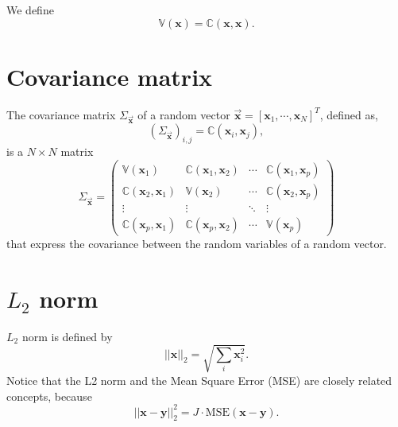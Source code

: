 We define
\begin{equation}
  \mathbb{V}(\mathbf{x}) = \mathbb{C}(\mathbf{x}, \mathbf{x}).
\end{equation}


\section{Covariance matrix}
\label{sec:covariance_matrix}

The covariance matrix $\Sigma_{\overrightarrow{\mathbf{x}}}$ of a random vector $\overrightarrow{\mathbf{x}}=[\mathbf{x}_1,\cdots,\mathbf{x}_N]^T$, defined as,
\begin{equation}
  (\Sigma_{\overrightarrow{\mathbf{x}}})_{i,j}=\mathbb{C}(\mathbf{x}_i,\mathbf{x}_j),
\end{equation}
is a $N\times N$ matrix
\begin{equation}
\Sigma_{\overrightarrow{\mathbf{x}}} = 
\begin{pmatrix}
\mathbb{V}(\mathbf{x}_1) & \mathbb{C}(\mathbf{x}_1, \mathbf{x}_2) & \cdots & \mathbb{C}(\mathbf{x}_1, \mathbf{x}_p) \\
\mathbb{C}(\mathbf{x}_2, \mathbf{x}_1) & \mathbb{V}(\mathbf{x}_2) & \cdots & \mathbb{C}(\mathbf{x}_2, \mathbf{x}_p) \\
\vdots & \vdots & \ddots & \vdots \\
\mathbb{C}(\mathbf{x}_p, \mathbf{x}_1) & \mathbb{C}(\mathbf{x}_p, \mathbf{x}_2) & \cdots & \mathbb{V}(\mathbf{x}_p)
\end{pmatrix}
\end{equation}
that express the covariance between the random variables of a random vector.


\section{$L_2$ norm}
\label{sec:L2_norm}

$L_2$ norm is defined by
\begin{equation}
  ||\mathbf{x}||_2 = \sqrt{\sum_i\mathbf{x}_i^2}.
\end{equation}
Notice that the L2 norm and the Mean Square Error (MSE) are closely
related concepts, because
\begin{equation}
  ||\mathbf{x} - \mathbf{y}||_2^2 = J\cdot\text{MSE}(\mathbf{x} - \mathbf{y}).
\end{equation}


